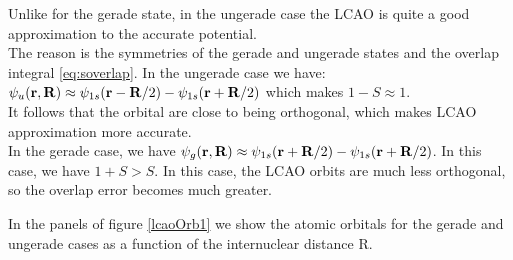 Unlike for the gerade state, in the ungerade case the LCAO is quite a good approximation to the accurate potential. \\
The reason is the symmetries of the gerade and ungerade states and the overlap integral \eqref{eq:soverlap}.
In the ungerade case we have:\\
$ \psi_{u}({\bf r},{\bf R}) \approx  \psi_{1s}({\bf r}-{\bf R}/2 ) - \psi_{1s}({\bf r}+{\bf R}/2 ) $ which makes $ 1 - S \approx 1 $.\\
It follows that the orbital are close to being orthogonal, which makes LCAO approximation more accurate.\\

In the gerade case, we have $ \psi_{g}({\bf r},{\bf R}) \approx  \psi_{1s}({\bf r}+{\bf R}/2 ) - \psi_{1s}({\bf r}+{\bf R}/2 ) $. In this case, we have $ 1 + S > S $. In this case, the LCAO orbits are much less orthogonal, so the overlap error becomes much greater.

In the panels of figure \ref{lcaoOrb1} we show the atomic orbitals for the gerade and ungerade cases as a function of the internuclear distance R.

